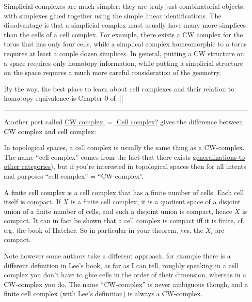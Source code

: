 Simplicial complexes are much simpler: they are truly just combinatorial objects, with simplexes glued together using the simple linear identifications.  The disadvantage is that a simplicial complex must usually have many more simplices than the cells of a cell complex.  For example, there exists a CW complex for the torus that has only four cells, while a simplical complex homeomorphic to a torus requires at least a couple dozen simplices.  In general, putting a CW structure on a space requires only homotopy information, while putting a simplicial structure on the space requires a much more careful consideration of the geometry.\par

By the way, the best place to learn about cell complexes and their relation to homotopy equivalence is Chapter 0 of \cite{hatcher}.\hfill ||

\vspace{3pt}
\hrule
\vspace{3pt}

Another post called \href{https://math.stackexchange.com/questions/1837569}{CW complex $=$ Cell complex?} gives the difference between CW complex and cell complex:

In topological spaces, a cell complex is usually the same thing as a CW-complex. The name ``cell complex'' comes from the fact that there exists \href{https://ncatlab.org/nlab/show/cell+complex}{generalizations to other categories}), but if you're interested in topological spaces then for all intents and purposes ``cell complex'' = ``CW-complex''.\par

A finite cell complex is a cell complex that has a finite number of cells. Each cell itself is compact. If $X$ is a finite cell complex, it is a quotient space of a disjoint union of a finite number of cells, and such a disjoint union is compact, hence $X$ is compact. It can in fact be shown that a cell complex is compact iff it is finite, cf. e.g. the book of Hatcher. So in particular in your theorem, yes, the $X_i$ are compact.\par

Note however some authors take a different approach, for example there is a different definition in Lee's book, as far as I can tell, roughly speaking in a cell complex you don't have to glue cells in the order of their dimension, whereas in a CW-complex you do. The name ``CW-complex'' is never ambiguous though, and a finite cell complex (with Lee's definition) is always a CW-complex.

